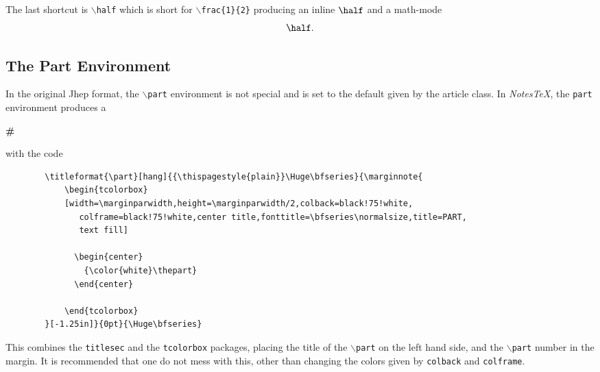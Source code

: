 \documentclass[10pt]{article}
\begin{document}
	The last shortcut is \texttt{$\backslash$half} which is short for \texttt{$\backslash$frac\{1\}\{2\}} producing an inline $\half$ and a math-mode
	\begin{equation*}
		\half.
	\end{equation*}



	\subsection{The Part Environment}
	In the original Jhep format, the \texttt{$\backslash$part} environment is not special and is set to the default given by the article class. In \textit{NotesTeX}, the \texttt{part} environment produces a

	{{\centering
		\begin{tcolorbox}[width=\marginparwidth,height=\marginparwidth/2,colback=black!75!white,colframe=black!75!white,center title,fonttitle=\bfseries\normalsize,title=PART,text fill]
		  \begin{center}
		  {\color{white}\Huge\bfseries\#}
		  \end{center}
		\end{tcolorbox}
	}}
	\noindent with the code
	\begin{verbatim}
		\titleformat{\part}[hang]{{\thispagestyle{plain}}\Huge\bfseries}{\marginnote{
			\begin{tcolorbox}
			[width=\marginparwidth,height=\marginparwidth/2,colback=black!75!white,
			   colframe=black!75!white,center title,fonttitle=\bfseries\normalsize,title=PART,
			   text fill]

			  \begin{center}
			  	{\color{white}\thepart}
			  \end{center}

			\end{tcolorbox}
		}[-1.25in]}{0pt}{\Huge\bfseries}
	\end{verbatim}
	This combines the \texttt{titlesec} and the \texttt{tcolorbox} packages, placing the title of the \texttt{$\backslash$part} on the left hand side, and the \texttt{$\backslash$part} number in the margin. It is recommended that one do not mess with this, other than changing the colors given by \texttt{colback} and \texttt{colframe}.
	\newpage
\end{document}
